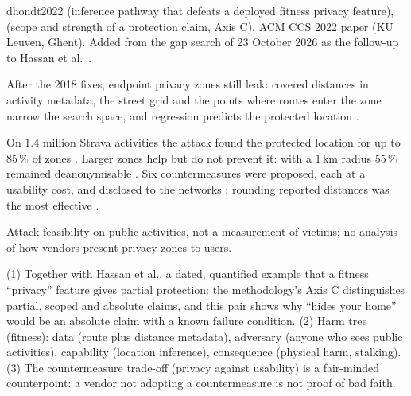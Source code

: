 \begin{papercard}{dhondt2022}
  (inference pathway that defeats a deployed fitness privacy feature),  (scope and strength of a protection claim, Axis C). ACM CCS 2022 paper (KU Leuven, Ghent). Added from the gap search of 23 October 2026 as the follow-up to Hassan et al.\ .

 After the 2018 fixes, endpoint privacy zones still leak: covered distances in activity metadata, the street grid and the points where routes enter the zone narrow the search space, and regression predicts the protected location .

 On 1.4 million Strava activities the attack found the protected location for up to 85\,\% of zones . Larger zones help but do not prevent it: with a 1\,km radius 55\,\% remained deanonymisable . Six countermeasures were proposed, each at a usability cost, and disclosed to the networks ; rounding reported distances was the most effective .

 Attack feasibility on public activities, not a measurement of victims; no analysis of how vendors present privacy zones to users.

 (1) Together with Hassan et al., a dated, quantified example that a fitness ``privacy'' feature gives partial protection: the methodology's Axis C distinguishes partial, scoped and absolute claims, and this pair shows why ``hides your home'' would be an absolute claim with a known failure condition. (2) Harm tree (fitness): data (route plus distance metadata), adversary (anyone who sees public activities), capability (location inference), consequence (physical harm, stalking). (3) The countermeasure trade-off (privacy against usability) is a fair-minded counterpoint: a vendor not adopting a countermeasure is not proof of bad faith.
\end{papercard}
